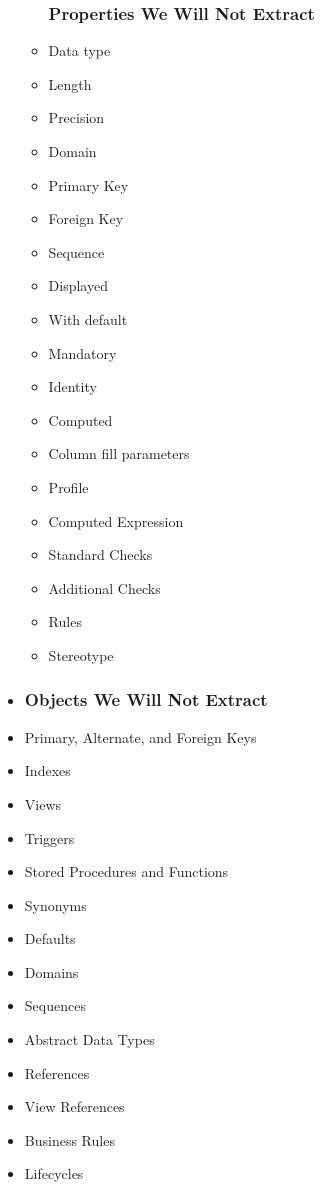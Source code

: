 \documentclass[12pt,a4paper]{report}
\let\openright=\clearpage
\begin{document}
\begin{itemize}
\begin{itemize}
		\subsubsection{Properties We Will Not Extract}
		\item Data type 
		\item Length 
		\item Precision
		\item Domain
		\item Primary Key
		\item Foreign Key
		\item Sequence
		\item Displayed
		\item With default
		\item Mandatory
		\item Identity
		\item Computed
		\item Column fill parameters
		\item Profile 
		\item Computed Expression
		\item Standard Checks
		\item Additional Checks
		\item Rules
		\item Stereotype
	\end{itemize}
	\item {}
	\subsubsection{Objects We Will Not Extract}
	\item Primary, Alternate, and Foreign Keys 
	\item Indexes
	\item Views
	\item Triggers
	\item Stored Procedures and Functions
	\item Synonyms 
	\item Defaults
	\item Domains
	\item Sequences 
	\item Abstract Data Types
	\item References
	\item View References
	\item Business Rules
	\item Lifecycles
\end{itemize}

\openright
\end{document}

